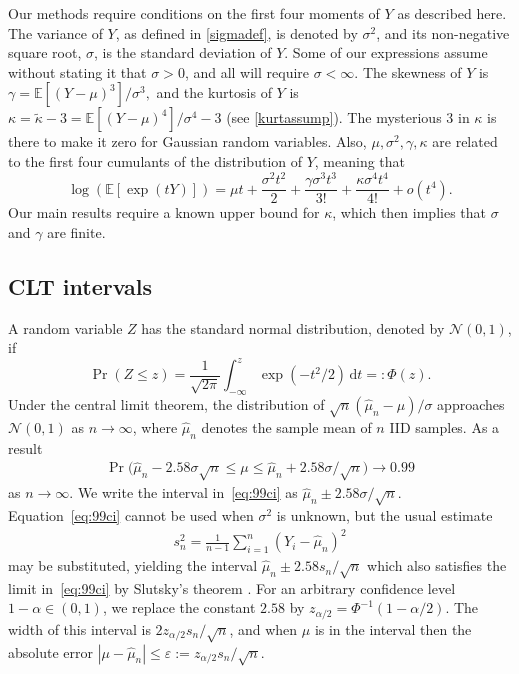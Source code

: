 \documentclass[graybox]{svmult}
\newcommand\e{\mathbb{E}}
\newcommand{\rd}{\,\mathrm{d}}
\newcommand{\dnorm}{\mathcal{N}}
\newcommand{\hmu}{\hat{\mu}}
\newcommand{\tkappa}{\tilde{\kappa}}
\begin{document}
Our methods require conditions on the first four moments of
$Y$ as described here. The variance of $Y$, as defined in \eqref{sigmadef}, is denoted by $\sigma^2$, and its non-negative square root, $\sigma$, is the standard deviation of $Y$.   Some of our expressions assume without stating it that $\sigma>0$, and all will require $\sigma<\infty$.  The skewness of $Y$ is
$ \gamma = \e[ (Y-\mu)^3 ]/\sigma^3,$
and the kurtosis of $Y$ is
$ \kappa = \tkappa-3 = \e[(Y-\mu)^4]/\sigma^4-3$ (see \eqref{kurtassump}).
The mysterious $3$ in $\kappa$ is there to
make it zero for Gaussian random variables.
Also, $\mu,\sigma^2,\gamma,\kappa$ are related to the
first four cumulants \cite[Chap.\ 2]{McC87a} of the distribution of $Y$, meaning that
\[
\log(\e[\exp(tY)]) = \mu t + \frac{\sigma^2 t^2}{2} + \frac{ \gamma \sigma^3t^3}{3!} + \frac{\kappa \sigma^4 t^4}{4!} + o(t^4).
\]
Our main results require a known upper bound for $\kappa$, which then implies that $\sigma$ and $\gamma$ are finite.

\subsection{CLT intervals}

A random variable $Z$ has the standard normal distribution,
denoted by $\dnorm(0,1)$, if 
$$\Pr( Z\le z ) = \frac1{\sqrt{2\pi}}\int_{-\infty}^z
\exp(-t^2/2)\rd t =: \Phi(z).$$
Under the central limit theorem,
the distribution of $\sqrt{n}(\hat\mu_n-\mu)/\sigma$
approaches $\dnorm(0,1)$ 
as $n\to\infty$, where $\hmu_n$ denotes the sample mean of $n$ IID samples.
As a result
\begin{align}\label{eq:99ci}
\Pr\bigl(
\hat\mu_n-2.58\sigma\sqrt{n}
\le \mu\le
\hat\mu_n+2.58\sigma/\sqrt{n}\bigr)
\to 0.99
\end{align}
as $n\to\infty$.
We write the interval in~\eqref{eq:99ci}
as $\hat\mu_n\pm 2.58\sigma/\sqrt{n}$.
Equation~\eqref{eq:99ci} cannot be used when
$\sigma^2$ is unknown, but the usual estimate
\begin{align}\label{eq:samplevar}
s^2_n = \frac1{n-1}\sum_{i=1}^n(Y_i-\hat\mu_n)^2
\end{align}
may be substituted, yielding the interval
$\hat\mu_n\pm2.58s_n/\sqrt{n}$ which also
satisfies the limit in~\eqref{eq:99ci}
by Slutsky's theorem \citep{LehRom01a}. For an arbitrary
confidence level $1-\alpha\in(0,1)$, we replace
the constant $2.58$ by $z_{\alpha/2}=\Phi^{-1}(1-\alpha/2)$.
The width of this interval is
$2z_{\alpha/2}s_n/\sqrt{n}$, and when $\mu$ is in
the interval then the absolute error
$|\mu-\hat\mu_n|\le 
\varepsilon := z_{\alpha/2}s_n/\sqrt{n}$.
\end{document}
